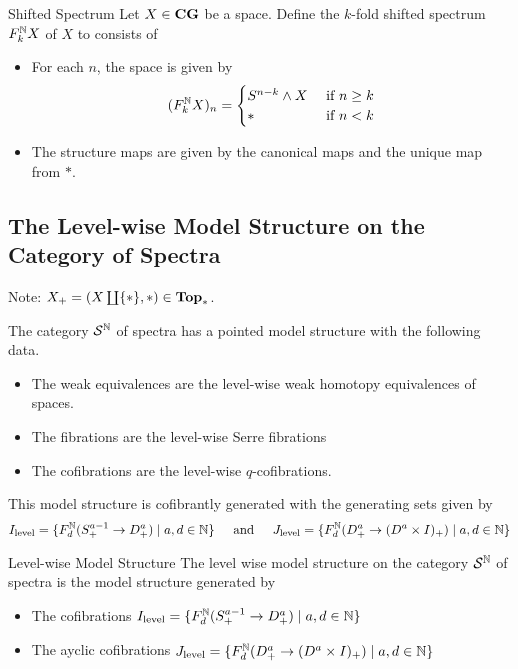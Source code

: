 \documentclass[a4paper]{article}
\begin{document}
\begin{defn}{Shifted Spectrum}{} Let $X\in\bold{CG}$ be a space. Define the $k$-fold shifted spectrum $F_k^{\mathbb{N}} X$ of $X$ to consists of 
\begin{itemize}
\item For each $n$, the space is given by $$(F_k^{\mathbb{N}} X)_n=\begin{cases}
S^{n-k}\wedge X & \text{ if } n\geq k\\
\ast & \text{ if } n<k
\end{cases}$$
\item The structure maps are given by the canonical maps and the unique map from $\ast$. 
\end{itemize}
\end{defn}

\subsection{The Level-wise Model Structure on the Category of Spectra}
Note: $X_+=(X\coprod\{\ast\},\ast)\in\bold{Top}_\ast$. 

\begin{thm}{}{} The category $\mathcal{S}^{\mathbb{N}}$ of spectra has a pointed model structure with the following data. 
\begin{itemize}
\item The weak equivalences are the level-wise weak homotopy equivalences of spaces. 
\item The fibrations are the level-wise Serre fibrations
\item The cofibrations are the level-wise $q$-cofibrations. 
\end{itemize}
This model structure is cofibrantly generated with the generating sets given by $$I_\text{level}=\{F_d^{\mathbb{N}}(S_+^{a-1}\to D_+^a)\;|\;a,d\in\mathbb{N}\}\;\;\;\;\text{ and }\;\;\;\; J_\text{level}=\{F_d^{\mathbb{N}}(D_+^a\to(D^a\times I)_+)\;|\;a,d\in\mathbb{N}\}$$
\end{thm}

\begin{defn}{Level-wise Model Structure}{} The level wise model structure on the category $\mathcal{S}^{\mathbb{N}}$ of spectra is the model structure generated by 
\begin{itemize}
\item The cofibrations $I_\text{level}=\{F_d^{\mathbb{N}}(S_+^{a-1}\to D_+^a)\;|\;a,d\in\mathbb{N}\}$
\item The ayclic cofibrations $J_\text{level}=\{F_d^{\mathbb{N}}(D_+^a\to(D^a\times I)_+)\;|\;a,d\in\mathbb{N}\}$
\end{itemize}
\end{defn}
\end{document}
